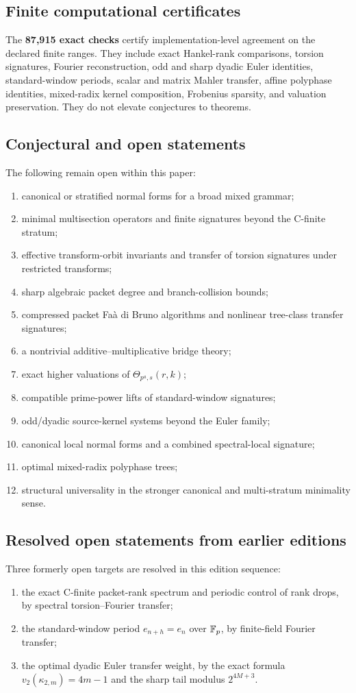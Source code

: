 \documentclass[11pt]{article}
\theoremstyle{definition}\newtheorem{definition}[theorem]{Definition}\newtheorem{example}[theorem]{Example}\newtheorem{construction}[theorem]{Construction}\newtheorem{algorithm}[theorem]{Algorithm}\newtheorem{conjecture}[theorem]{Conjecture}\newtheorem{problem}[theorem]{Problem}
\theoremstyle{remark}\newtheorem{remark}[theorem]{Remark}\newtheorem{boundary}[theorem]{Boundary}\newtheorem{certificate}[theorem]{Computational Certificate}\newtheorem{classical}[theorem]{Classical Input}\newtheorem{principle}[theorem]{Structural Principle}
\begin{document}
\subsection{Finite computational certificates}
The \textbf{87,915 exact checks} certify implementation-level agreement on the declared finite ranges. They include exact Hankel-rank comparisons, torsion signatures, Fourier reconstruction, odd and sharp dyadic Euler identities, standard-window periods, scalar and matrix Mahler transfer, affine polyphase identities, mixed-radix kernel composition, Frobenius sparsity, and valuation preservation. They do not elevate conjectures to theorems.

\subsection{Conjectural and open statements}
The following remain open within this paper:
\begin{enumerate}
\item canonical or stratified normal forms for a broad mixed grammar;
\item minimal multisection operators and finite signatures beyond the C-finite stratum;
\item effective transform-orbit invariants and transfer of torsion signatures under restricted transforms;
\item sharp algebraic packet degree and branch-collision bounds;
\item compressed packet Fa\`a di Bruno algorithms and nonlinear tree-class transfer signatures;
\item a nontrivial additive--multiplicative bridge theory;
\item exact higher valuations of $\Theta_{p^a,s}(r,k)$;
\item compatible prime-power lifts of standard-window signatures;
\item odd/dyadic source-kernel systems beyond the Euler family;
\item canonical local normal forms and a combined spectral-local signature;
\item optimal mixed-radix polyphase trees;
\item structural universality in the stronger canonical and multi-stratum minimality sense.
\end{enumerate}

\subsection{Resolved open statements from earlier editions}
Three formerly open targets are resolved in this edition sequence:
\begin{enumerate}
\item the exact C-finite packet-rank spectrum and periodic control of rank drops, by spectral torsion--Fourier transfer;
\item the standard-window period $e_{n+h}=e_n$ over $\mathbb F_p$, by finite-field Fourier transfer;
\item the optimal dyadic Euler transfer weight, by the exact formula $v_2(\kappa_{2,m})=4m-1$ and the sharp tail modulus $2^{4M+3}$.
\end{enumerate}
\end{document}
